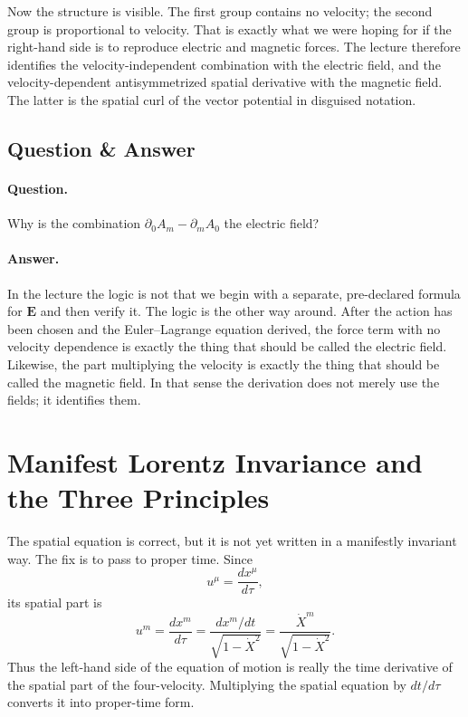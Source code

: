 Now the structure is visible. The first group contains no velocity; the second group is proportional to velocity. That is exactly what we were hoping for if the right-hand side is to reproduce electric and magnetic forces. The lecture therefore identifies the velocity-independent combination with the electric field, and the velocity-dependent antisymmetrized spatial derivative with the magnetic field. The latter is the spatial curl of the vector potential in disguised notation.

\subsection{Question \& Answer}

\paragraph{Question.} Why is the combination $\partial_0A_m-\partial_mA_0$ the electric field?

\paragraph{Answer.} In the lecture the logic is not that we begin with a separate, pre-declared formula for $\mathbf E$ and then verify it. The logic is the other way around. After the action has been chosen and the Euler--Lagrange equation derived, the force term with no velocity dependence is exactly the thing that should be called the electric field. Likewise, the part multiplying the velocity is exactly the thing that should be called the magnetic field. In that sense the derivation does not merely use the fields; it identifies them.

\section{Manifest Lorentz Invariance and the Three Principles}

The spatial equation is correct, but it is not yet written in a manifestly invariant way. The fix is to pass to proper time. Since
\begin{equation}
u^\mu=\frac{dx^\mu}{d\tau},
\end{equation}
its spatial part is
\begin{equation}
u^m=\frac{dx^m}{d\tau}
=
\frac{dx^m/dt}{\sqrt{1-\dot X^2}}
=
\frac{\dot X^m}{\sqrt{1-\dot X^2}}.
\end{equation}
Thus the left-hand side of the equation of motion is really the time derivative of the spatial part of the four-velocity. Multiplying the spatial equation by $dt/d\tau$ converts it into proper-time form.


